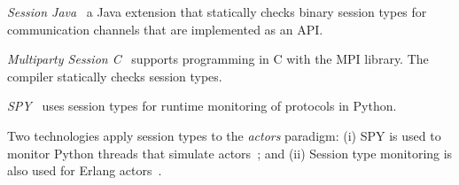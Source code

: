 %
%
%
%
%
%
%
%


%
{\em Session Java}~\cite{HU07TYPE-SAFE}
a Java extension that statically checks binary session types for communication channels
that are implemented as an API.

{\em Multiparty Session C}~\cite{NYH12} supports programming in C with the MPI library. The compiler statically checks session types.

{\em SPY}~\cite{DBLP:conf/rv/NeykovaYH13} uses session types for runtime monitoring of %
protocols in Python.

Two technologies apply session types to the {\em actors} paradigm:
(i) SPY is used to monitor Python threads that simulate actors~\cite{DBLP:conf/coordination/NeykovaY14}; and
(ii)	Session type monitoring is also used for Erlang actors~\cite{SF15}.

